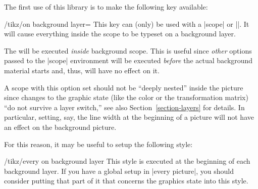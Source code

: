 The first use of this library is to make the following key available: 
\begin{key}{/tikz/on background layer=}
  This key can (only) be used with a |{scope}| or |\scoped|. It will
  cause everything inside the scope to be typeset on a background
  layer. 

  The  will be executed \emph{inside} background
  scope. This is useful since \emph{other} options passed to the 
  |{scope}| environment will be executed \emph{before} the actual
  background material starts and, thus, will have no effect on it.

\begin{codeexample}[]
\end{codeexample}

  A scope with this option set should not be ``deeply nested'' inside 
  the picture since changes to the graphic state (like the color or
  the transformation matrix) ``do not survive a layer switch,'' see
  also Section~\ref{section-layers} for details. In particular,
  setting, say, the line width at the beginning of a picture will not
  have an effect on the background picture.

  For this reason, it may be useful to setup the following style:
  \begin{stylekey}{/tikz/every on background layer}
    This style is executed at the beginning of each background
    layer. If you have a global setup in |every picture|, you should
    consider putting that part of it that concerns the graphics state
    into this style.

\begin{codeexample}[]
\end{codeexample}
  \end{stylekey}
\end{key}


